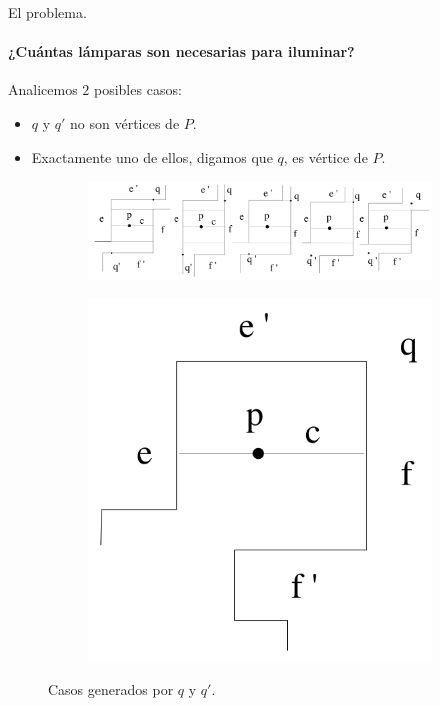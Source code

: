\begin{frame}{El problema.} %
  \framesubtitle{¿Cuántas lámparas son necesarias para iluminar?} %
  Analicemos $2$ posibles casos:
  \begin{itemize}
  \item $q$ y $q'$ no son vértices de $P$.
  \item Exactamente uno de ellos, digamos que $q$, es vértice de $P$.
  \end{itemize}
  \begin{figure}
    \centering
    \begin{subfigure}[b]{0.59\paperwidth}
      \includegraphics[width=.6 \paperwidth]{./images/CasosOrtogonales.png}
    \end{subfigure}
    \begin{subfigure}[b]{0.1\paperwidth}
      \includegraphics[width=.16 \paperwidth]{./images/CasoOrtogonal.png}
    \end{subfigure}
    \caption*{Casos generados por $q$ y $q'$.}
  \end{figure}
\end{frame}

